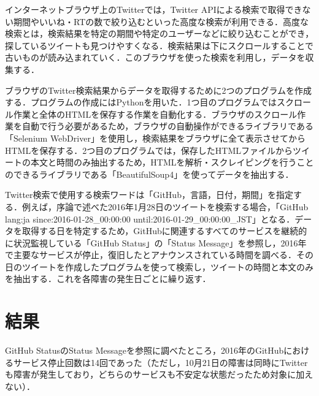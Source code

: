 \documentclass[uplatex,twocolumn]{jsarticle}
\begin{document}
インターネットブラウザ上のTwitterでは，Twitter APIによる検索で取得できない期間やいいね・RTの数で絞り込むといった高度な検索が利用できる．高度な検索とは，検索結果を特定の期間や特定のユーザーなどに絞り込むことができ，探しているツイートも見つけやすくなる．検索結果は下にスクロールすることで古いものが読み込まれていく．このブラウザを使った検索を利用し，データを収集する\cite{03}．

ブラウザのTwitter検索結果からデータを取得するために2つのプログラムを作成する．プログラムの作成にはPythonを用いた．1つ目のプログラムではスクロール作業と全体のHTMLを保存する作業を自動化する．ブラウザのスクロール作業を自動で行う必要があるため，ブラウザの自動操作ができるライブラリである「Selenium WebDriver」を使用し，検索結果をブラウザに全て表示させてからHTMLを保存する．2つ目のプログラムでは，保存したHTMLファイルからツイートの本文と時間のみ抽出するため，HTMLを解析・スクレイピングを行うことのできるライブラリである「BeautifulSoup4」を使ってデータを抽出する．

Twitter検索で使用する検索ワードは「GitHub，言語，日付，期間」を指定する．例えば，序論で述べた2016年1月28日のツイートを検索する場合，「GitHub lang:ja since:2016-01-28\_00:00:00 until:2016-01-29\_00:00:00\_JST」となる．データを取得する日を特定するため，GitHubに関連するすべてのサービスを継続的に状況監視している「GitHub Status」の「Status Message」を参照し，2016年で主要なサービスが停止，復旧したとアナウンスされている時間を調べる．その日のツイートを作成したプログラムを使って検索し，ツイートの時間と本文のみを抽出する．これを各障害の発生日ごとに繰り返す．

\section{結果}
GitHub StatusのStatus Messageを参照に調べたところ，2016年のGitHubにおけるサービス停止回数は14回であった（ただし，10月21日の障害は同時にTwitterも障害が発生しており，どちらのサービスも不安定な状態だったため対象に加えない）．
\end{document}
